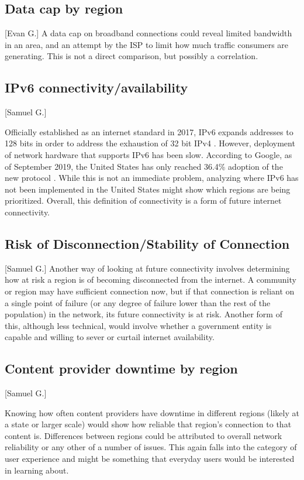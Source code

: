 \subsection{Data cap by region}[Evan G.]
A data cap on broadband connections could reveal limited bandwidth in an area, and an attempt by the ISP to limit how much traffic consumers are generating. This is not a direct comparison, but possibly a correlation.

\subsection{IPv6 connectivity/availability}[Samuel G.]

Officially established as an internet standard in 2017, IPv6 expands \ip addresses to 128 bits in order to address the exhaustion of 32 bit IPv4 \ips. However, deployment of network hardware that supports IPv6 has been slow. According to Google, as of September 2019, the United States has only reached 36.4\% adoption of the new protocol \cite{Google2019a}. While this is not an immediate problem, analyzing where IPv6 has not been implemented in the United States might show which regions are being prioritized. Overall, this definition of connectivity is a form of future internet connectivity.

\subsection{Risk of Disconnection/Stability of Connection}[Samuel G.]
Another way of looking at future connectivity involves determining how at risk a region is of becoming disconnected from the internet. A community or region may have sufficient connection now, but if that connection is reliant on a single point of failure (or any degree of failure lower than the rest of the population) in the network, its future connectivity is at risk. Another form of this, although less technical, would involve whether a government entity is capable and willing to sever or curtail internet availability.

\subsection{Content provider downtime by region}[Samuel G.]

Knowing how often content providers have downtime in different regions (likely at a state or larger scale) would show how reliable that region's connection to that content is. Differences between regions could be attributed to overall network reliability or any other of a number of issues. This again falls into the category of user experience and might be something that everyday users would be interested in learning about.
